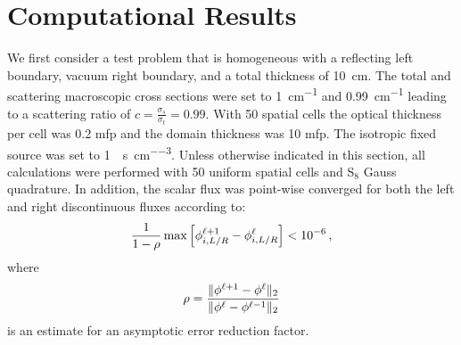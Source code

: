 
\section{Computational Results}
We first consider a test problem that is homogeneous with a reflecting left boundary, vacuum right boundary, and a total thickness of \SI{10}{cm}.  The total and scattering macroscopic cross sections were set to \SI{1}{cm^{-1}} and 
\SI{0.99}{cm^{-1}} leading to a scattering ratio of $c = \frac{\sigma_s}{\sigma_t}=0.99$. With 50 spatial cells the optical thickness per cell was 0.2 mfp and the domain thickness was 10 mfp. The isotropic fixed source was set to \SI{1}{\particles\per\second\per\cm\cubed}. 
Unless otherwise indicated in this section, all calculations were performed with 50 uniform spatial cells and S$_8$ Gauss quadrature. In addition, the scalar flux was point-wise converged for both the left and right discontinuous fluxes according to:
	\begin{equation} 
		\frac{1}{1 - \rho}\max\left[ \phi_{i,L/R}^{\ell+1} - \phi_{i,L/R}^\ell \right] < \num{e-6} \,,
	\end{equation}
where 
	\begin{equation}
		\rho = \frac{\| \phi^{\ell+1} - \phi^\ell \|_2}{\| \phi^\ell - \phi^{\ell-1} \|_2}
	\end{equation}
is an estimate for an asymptotic error reduction factor.

